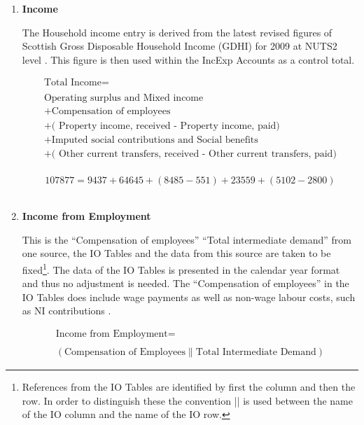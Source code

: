 \begin{enumerate}


\item \textbf {Income}

\bigskip

The Household income entry is derived from the latest revised figures of Scottish Gross Disposable Household Income (GDHI) for 2009 at NUTS2 level \cite{ONS2013a}. This figure is then used within the IncExp Accounts as a control total.

\bigskip

\begin{equation}
\begin{split}
\text{Total Income} =  \\ \\
\text{Operating surplus and Mixed income}\\
+\text{Compensation of employees}\\
+\text{( Property income, received - Property income, paid)}\\
+\text{Imputed social contributions and Social benefits}\\
+\text{( Other current transfers, received - Other current transfers, paid)}\\
\end{split} \label{eq:2.5.1}
\end{equation}

\begin{equation} \nonumber
107877 = 9437 + 64645 + (8485 - 551) + 23559 + (5102 - 2800)
\end{equation}\\


\item \textbf {Income from Employment}

This is the ``Compensation of employees'' \text{||} ``Total intermediate demand'' from one source, the IO Tables and the data from this source are taken to be fixed\footnote{References from the IO Tables are identified by first the column and then the row. In order to distinguish these the convention || is used between the name of the IO column and the name of the IO row.}. The data of the IO Tables is presented in the calendar year format and thus no adjustment is needed.  The ``Compensation of employees'' in the IO Tables does include wage payments as well as non-wage labour costs, such as NI contributions \cite{ScottishGovernment2013a}.

\begin{equation}
\begin{split}
\text{Income from Employment} =  \\ \\
(\text{Compensation of Employees}\|\text{Total Intermediate Demand})
\end{split} \label{eq:2.5.2}
\end{equation}


\end{enumerate}
